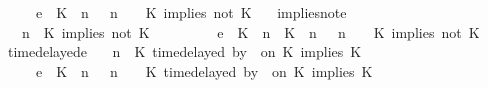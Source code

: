 \begin{isabellebody}
\ \ \ \ \ {\isasymhookrightarrow}\isactrlsub e\ \ {\isacharparenleft}{\isacharparenleft}{\isacharparenleft}K\ {\isasymnot}{\isasymUp}\ n{\isacharparenright}\ {\isacharhash}\ {\isasymGamma}{\isacharparenright}{\isacharcomma}\ n\ {\isasymturnstile}\ {\isasymPsi}\ {\isasymtriangleright}\ {\isacharparenleft}{\isacharparenleft}K\ implies\ not\ K\ {\isacharhash}\ {\isasymPhi}{\isacharparenright}{\isacharparenright}{\isacartoucheclose}\isanewline
{\isacharbar}\ implies{\isacharunderscore}not{\isacharunderscore}e{}{\isacharcolon}\isanewline
%
\isanewline
\ \ {\isacartoucheopen}{\isacharparenleft}{\isasymGamma}{\isacharcomma}\ n\ {\isasymturnstile}\ {\isacharparenleft}{\isacharparenleft}K\ implies\ not\ K\ {\isacharhash}\ {\isasymPsi}{\isacharparenright}\ {\isasymtriangleright}\ {\isasymPhi}{\isacharparenright}\isanewline
\ \ \ \ \ {\isasymhookrightarrow}\isactrlsub e\ \ {\isacharparenleft}{\isacharparenleft}{\isacharparenleft}K\ {\isasymUp}\ n{\isacharparenright}\ {\isacharhash}\ {\isacharparenleft}K\ {\isasymnot}{\isasymUp}\ n{\isacharparenright}\ {\isacharhash}\ {\isasymGamma}{\isacharparenright}{\isacharcomma}\ n\ {\isasymturnstile}\ {\isasymPsi}\ {\isasymtriangleright}\ {\isacharparenleft}{\isacharparenleft}K\ implies\ not\ K\ {\isacharhash}\ {\isasymPhi}{\isacharparenright}{\isacharparenright}{\isacartoucheclose}\isanewline
{\isacharbar}\ timedelayed{\isacharunderscore}e{}{\isacharcolon}\isanewline
%
\isanewline
\ \ {\isacartoucheopen}{\isacharparenleft}{\isasymGamma}{\isacharcomma}\ n\ {\isasymturnstile}\ {\isacharparenleft}{\isacharparenleft}K\ time{\isacharminus}delayed\ by\ {\isasymdelta}{\isasymtau}\ on\ K\ implies\ K\ {\isacharhash}\ {\isasymPsi}{\isacharparenright}\ {\isasymtriangleright}\ {\isasymPhi}{\isacharparenright}\isanewline
\ \ \ \ \ {\isasymhookrightarrow}\isactrlsub e\ \ {\isacharparenleft}{\isacharparenleft}{\isacharparenleft}K\ {\isasymnot}{\isasymUp}\ n{\isacharparenright}\ {\isacharhash}\ {\isasymGamma}{\isacharparenright}{\isacharcomma}\ n\ {\isasymturnstile}\ {\isasymPsi}\ {\isasymtriangleright}\ {\isacharparenleft}{\isacharparenleft}K\ time{\isacharminus}delayed\ by\ {\isasymdelta}{\isasymtau}\ on\ K\ implies\ K\ {\isacharhash}\ {\isasymPhi}{\isacharparenright}{\isacharparenright}{\isacartoucheclose}\isanewline

\end{isabellebody}
